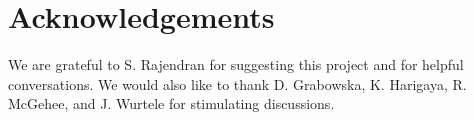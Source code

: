\documentclass[twocolumn,showpacs,preprintnumbers,amsmath,amssymb,prd]{revtex4}
\begin{document}
\section*{Acknowledgements}
We are grateful to S. Rajendran for suggesting this project and for helpful conversations. We would also like to thank D. Grabowska, K. Harigaya, R. McGehee, and J. Wurtele for stimulating discussions.


\end{document}
